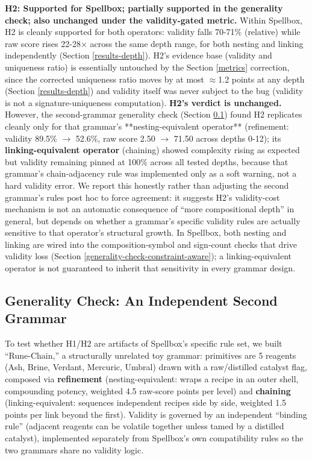 \documentclass[]{article}
\begin{document}
        \textbf{H2: Supported for Spellbox; partially supported in the generality check; also unchanged under the validity-gated metric.} Within Spellbox, H2 is cleanly supported for both operators: validity falls 70-71\% (relative) while raw score rises 22-28× across the same depth range, for both nesting and linking independently (Section \ref{results-depth}). H2's evidence base (validity and uniqueness ratio) is essentially untouched by the Section \ref{metrics} correction, since the corrected uniqueness ratio moves by at most $\approx$1.2 points at any depth (Section \ref{results-depth}) and validity itself was never subject to the bug (validity is not a signature-uniqueness computation). \textbf{H2's verdict is unchanged.} However, the second-grammar generality check (Section \ref{generality-check-second-grammar}) found H2 replicates cleanly only for that grammar's **nesting-equivalent operator** (refinement: validity 89.5\% $\to$ 52.6\%, raw score 2.50 $\to$ 71.50 across depths 0-12); its \textbf{linking-equivalent operator} (chaining) showed complexity rising as expected but validity remaining pinned at 100\% across all tested depths, because that grammar's chain-adjacency rule was implemented only as a soft warning, not a hard validity error. We report this honestly rather than adjusting the second grammar's rules post hoc to force agreement: it suggests H2's validity-cost mechanism is not an automatic consequence of ``more compositional depth'' in general, but depends on whether a grammar's specific validity rules are actually sensitive to that operator's structural growth. In Spellbox, both nesting and linking are wired into the composition-symbol and sign-count checks that drive validity loss (Section \ref{generality-check-constraint-aware}); a linking-equivalent operator is not guaranteed to inherit that sensitivity in every grammar design.

        \subsection{Generality Check: An Independent Second Grammar}\label{generality-check-second-grammar}

        To test whether H1/H2 are artifacts of Spellbox's specific rule set, we built ``Rune-Chain,'' a structurally unrelated toy grammar: primitives are 5 reagents (Ash, Brine, Verdant, Mercuric, Umbral) drawn with a raw/distilled catalyst flag, composed via \textbf{refinement} (nesting-equivalent: wraps a recipe in an outer shell, compounding potency, weighted 4.5 raw-score points per level) and \textbf{chaining} (linking-equivalent: sequences independent recipes side by side, weighted 1.5 points per link beyond the first). Validity is governed by an independent ``binding rule'' (adjacent reagents can be volatile together unless tamed by a distilled catalyst), implemented separately from Spellbox's own compatibility rules so the two grammars share no validity logic.
\end{document}
